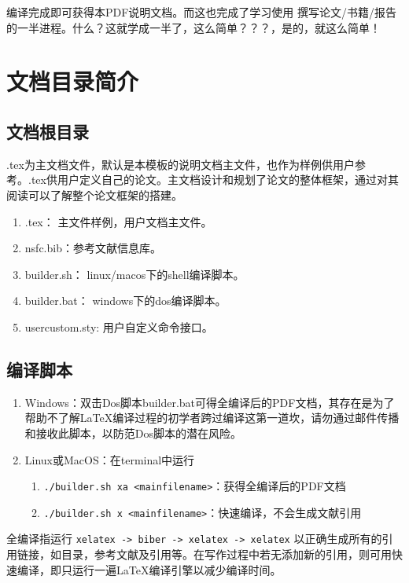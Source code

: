 编译完成即可获得本PDF说明文档。而这也完成了学习使用 \projectname 撰写论文/书籍/报告的一半进程。什么？这就学成一半了，这么简单？？？，是的，就这么简单！

\section{文档目录简介}

\subsection{文档根目录}

\projectname.tex为主文档文件，默认是本模板的说明文档主文件，也作为样例供用户参考。\projectname.tex供用户定义自己的论文。主文档设计和规划了论文的整体框架，通过对其阅读可以了解整个论文框架的搭建。


\begin{enumerate}
    \item \projectname.tex： 主文件样例，用户文档主文件。
    \item nsfc.bib：参考文献信息库。
    \item builder.sh： linux/macos下的shell编译脚本。
    \item builder.bat： windows下的dos编译脚本。
    \item usercustom.sty: 用户自定义命令接口。
\end{enumerate}

\subsection{编译脚本}

\begin{enumerate}
    \item Windows：双击Dos脚本builder.bat可得全编译后的PDF文档，其存在是为了帮助不了解\LaTeX{}编译过程的初学者跨过编译这第一道坎，请勿通过邮件传播和接收此脚本，以防范Dos脚本的潜在风险。
    \item Linux或MacOS：在terminal中运行
        \begin{enumerate}
            \item \verb|./builder.sh xa <mainfilename>|：获得全编译后的PDF文档
            \item \verb|./builder.sh x <mainfilename>|：快速编译，不会生成文献引用
        \end{enumerate}
\end{enumerate}

全编译指运行 \verb|xelatex -> biber -> xelatex -> xelatex| 以正确生成所有的引用链接，如目录，参考文献及引用等。在写作过程中若无添加新的引用，则可用快速编译，即只运行一遍\LaTeX{}编译引擎以减少编译时间。

